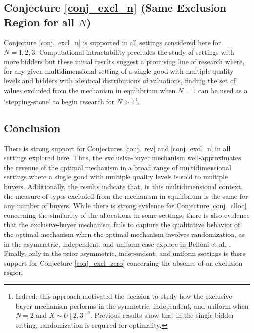 \subsection{Conjecture \ref{conj_excl_n} (Same Exclusion Region for all $N$)}

Conjecture \ref{conj_excl_n} is supported in all settings considered here for $N=1,2,3$. Computational intractability precludes the study of settings with more bidders but these initial results suggest a promising line of research where, for any given multidimensional setting of a single good with multiple quality levels and bidders with identical distributions of valuations, finding the set of values excluded from the mechanism in equilibrium when $N=1$ can be used as a `stepping-stone' to begin research for $N>1$\footnote{Indeed, this approach motivated the decision to study how the exclusive-buyer mechanism performs in the symmetric, independent, and uniform when $N=2$ and $X \sim U[2,3]^2$. Previous results \autocite{pavlov2011optimal} show that in the single-bidder setting, randomization is required for optimality.}. 











\subsection{Conclusion}

There is strong support for Conjectures \ref{conj_rev} and \ref{conj_excl_n} in all settings explored here. Thus, the exclusive-buyer mechanism well-approximates the revenue of the optimal mechanism in a broad range of multidimensional settings where a single good with multiple quality levels is sold to multiple buyers. Additionally, the results indicate that, in this multidimensional context, the measure of types excluded from the mechanism in equilibrium is the same for any number of buyers. While there is strong evidence for Conjecture \ref{conj_alloc} concerning the similarity of the allocations in some settings, there is also evidence that the exclusive-buyer mechanism fails to capture the qualitative behavior of the optimal mechanism when the optimal mechanism involves randomization, as in the asymmetric, independent, and uniform case explore in Belloni et al. \autocite*{belloni2010multidimensional}. Finally, only in the prior asymmetric, independent, and uniform settings is there support for Conjecture \ref{conj_excl_zero} concerning the absence of an exclusion region.


